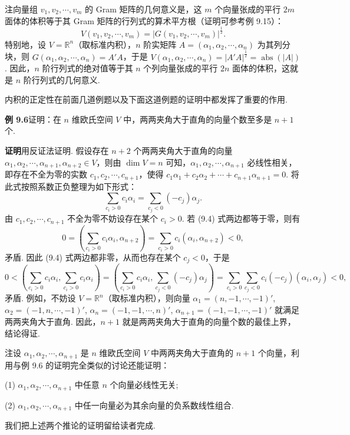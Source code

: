 \documentclass[UTF8, 12pt, fontset=fandol, oneside]{ctexart}
\begin{document}
注\quad 向量组 $v_1,v_2,\cdots,v_m$ 的 Gram 矩阵的几何意义是，这 $m$ 个向量张成的平行 $2m$ 面体的体积等于其 Gram 矩阵的行列式的算术平方根（证明可参考例 9.15）：
\[
V(v_1,v_2,\cdots,v_m)=|G(v_1,v_2,\cdots,v_m)|^{\frac12}.
\]
特别地，设 $V=\mathbb{R}^n$（取标准内积），$n$ 阶实矩阵 $A=(\alpha_1,\alpha_2,\cdots,\alpha_n)$ 为其列分块，则 $G(\alpha_1,\alpha_2,\cdots,\alpha_n)=A'A$，于是 $V(\alpha_1,\alpha_2,\cdots,\alpha_n)=|A'A|^{\frac12}=\operatorname{abs}(|A|)$. 因此，$n$ 阶行列式的绝对值等于其 $n$ 个列向量张成的平行 $2n$ 面体的体积，这就是 $n$ 阶行列式的几何意义.

内积的正定性在前面几道例题以及下面这道例题的证明中都发挥了重要的作用.

\noindent\textbf{例 9.6}\quad 证明：在 $n$ 维欧氏空间 $V$ 中，两两夹角大于直角的向量个数至多是 $n+1$ 个.

\noindent\textbf{证明}\quad 用反证法证明. 假设存在 $n+2$ 个两两夹角大于直角的向量 $\alpha_1,\alpha_2,\cdots,\alpha_{n+1},\alpha_{n+2}\in V$，则由 $\dim V=n$ 可知，$\alpha_1,\alpha_2,\cdots,\alpha_{n+1}$ 必线性相关，即存在不全为零的实数 $c_1,c_2,\cdots,c_{n+1}$，使得 $c_1\alpha_1+c_2\alpha_2+\cdots+c_{n+1}\alpha_{n+1}=0$. 将此式按照系数正负整理为如下形式：
\begin{equation}
\sum_{c_i>0}c_i\alpha_i=\sum_{c_j<0}(-c_j)\alpha_j.
\tag{9.4}
\end{equation}
由 $c_1,c_2,\cdots,c_{n+1}$ 不全为零不妨设存在某个 $c_i>0$. 若 (9.4) 式两边都等于零，则有
\[
0=\left(\sum_{c_i>0}c_i\alpha_i,\alpha_{n+2}\right)
=\sum_{c_i>0}c_i(\alpha_i,\alpha_{n+2})<0,
\]
矛盾. 因此 (9.4) 式两边都非零，从而也存在某个 $c_j<0$，于是
\[
0<\left(\sum_{c_i>0}c_i\alpha_i,\sum_{c_i>0}c_i\alpha_i\right)
=\left(\sum_{c_i>0}c_i\alpha_i,\sum_{c_j<0}(-c_j)\alpha_j\right)
=\sum_{c_i>0}\sum_{c_j<0}c_i(-c_j)(\alpha_i,\alpha_j)<0,
\]
矛盾. 例如，不妨设 $V=\mathbb{R}^n$（取标准内积），则向量 $\alpha_1=(n,-1,\cdots,-1)'$, $\alpha_2=(-1,n,\cdots,-1)'$, $\alpha_n=(-1,-1,\cdots,n)'$, $\alpha_{n+1}=(-1,-1,\cdots,-1)'$ 就满足两两夹角大于直角. 因此，$n+1$ 就是两两夹角大于直角的向量个数的最佳上界，结论得证.

注\quad 设 $\alpha_1,\alpha_2,\cdots,\alpha_{n+1}$ 是 $n$ 维欧氏空间 $V$ 中两两夹角大于直角的 $n+1$ 个向量，利用与例 9.6 的证明完全类似的讨论还能证明：

(1) $\alpha_1,\alpha_2,\cdots,\alpha_{n+1}$ 中任意 $n$ 个向量必线性无关;

(2) $\alpha_1,\alpha_2,\cdots,\alpha_{n+1}$ 中任一向量必为其余向量的负系数线性组合.

我们把上述两个推论的证明留给读者完成.
\end{document}
